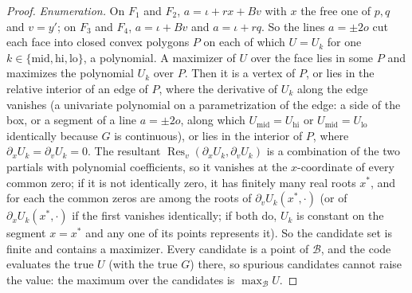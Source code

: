 \begin{proof}
\emph{Enumeration.} On $F_1$ and $F_2$, $a=\iota+rx+Bv$ with $x$ the free one of $p,q$ and $v=y'$; on $F_3$ and $F_4$, $a=\iota+Bv$ and $a=\iota+rq$. So the lines $a=\pm2o$ cut each face into closed convex polygons $P$ on each of which $U=U_k$ for one $k\in\{\text{mid},\text{hi},\text{lo}\}$, a polynomial. A maximizer of $U$ over the face lies in some $P$ and maximizes the polynomial $U_k$ over $P$. Then it is a vertex of $P$, or lies in the relative interior of an edge of $P$, where the derivative of $U_k$ along the edge vanishes (a univariate polynomial on a parametrization of the edge: a side of the box, or a segment of a line $a=\pm2o$, along which $U_\text{mid}=U_\text{hi}$ or $U_\text{mid}=U_\text{lo}$ identically because $G$ is continuous), or lies in the interior of $P$, where $\partial_xU_k=\partial_vU_k=0$. The resultant $\operatorname{Res}_v(\partial_xU_k,\partial_vU_k)$ is a combination of the two partials with polynomial coefficients, so it vanishes at the $x$-coordinate of every common zero; if it is not identically zero, it has finitely many real roots $x^*$, and for each the common zeros are among the roots of $\partial_vU_k(x^*,\cdot)$ (or of $\partial_xU_k(x^*,\cdot)$ if the first vanishes identically; if both do, $U_k$ is constant on the segment $x=x^*$ and any one of its points represents it). So the candidate set is finite and contains a maximizer. Every candidate is a point of $\mathcal B$, and the code evaluates the true $U$ (with the true $G$) there, so spurious candidates cannot raise the value: the maximum over the candidates is $\max_{\mathcal B}U$.
\end{proof}

